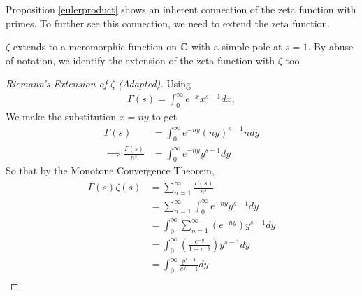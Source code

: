 Proposition \ref{eulerproduct} shows an inherent connection of the zeta function with primes.
To further see this connection, we need to extend the zeta function.
\begin{theorem}
	$\zeta$ extends to a meromorphic function on $\mathbb{C}$ with a simple pole at $s=1$. By abuse of notation, we identify the extension of the zeta function with $\zeta$ too.
\end{theorem}
\begin{proof}[Riemann's Extension of $\zeta$ (Adapted)]
	Using \begin{align*}
		\Gamma(s)=\int_{0}^{\infty} e^{-x}x^{s-1}dx,
	\end{align*}
	We make the substitution $x=ny$ to get \begin{align*}
		\Gamma(s)&= \int_{0}^{\infty} e^{-ny} (ny)^{s-1} n dy\\
		\implies \frac{\Gamma(s)}{n^s} &= \int_{0}^{\infty} e^{-ny} y^{s-1} dy
	\end{align*}
	So that by the Monotone Convergence Theorem,\begin{align*}
		\Gamma(s)\zeta(s) &= \sum_{n=1}^{\infty}\frac{\Gamma(s)}{n^s}\\
		&= \sum_{n=1}^{\infty} \int_{0}^{\infty} e^{-ny} y^{s-1} dy\\
		&=  \int_{0}^{\infty}\sum_{n=1}^{\infty}\left(e^{-ny}\right)  y^{s-1} dy\\
		&= \int_{0}^{\infty}\left(\frac{e^{-y}}{1-e^{-y}}\right)  y^{s-1} dy\\
		&= \int_{0}^{\infty}\frac{y^{s-1}}{e^{y}-1}  dy\\
	\end{align*}
\end{proof}